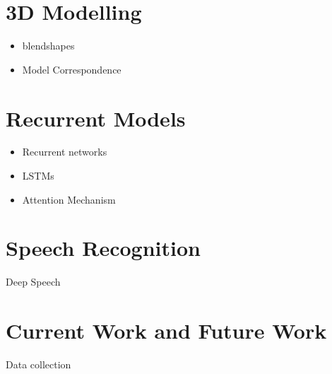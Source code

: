 \documentclass[12pt]{article}
\begin{document}
\section{3D Modelling}
\begin{itemize}
    \item blendshapes
    \item Model Correspondence
\end{itemize}

\section{Recurrent Models}
\begin{itemize}
    \item Recurrent networks
    \item LSTMs
    \item Attention Mechanism
\end{itemize}


\section{Speech Recognition}
Deep Speech \cite{Karras2017a}

\section{Current Work and Future Work}
Data collection



\end{document}

